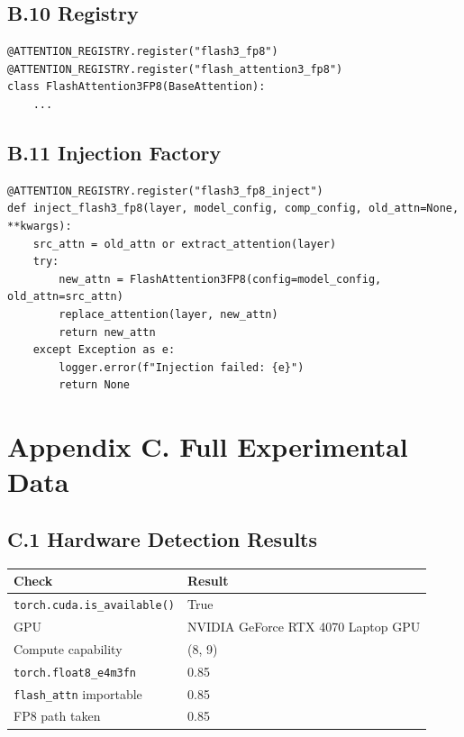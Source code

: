 \subsection{B.10 Registry}

\begin{lstlisting}
@ATTENTION_REGISTRY.register("flash3_fp8")
@ATTENTION_REGISTRY.register("flash_attention3_fp8")
class FlashAttention3FP8(BaseAttention):
    ...
\end{lstlisting}

\subsection{B.11 Injection Factory}

\begin{lstlisting}
@ATTENTION_REGISTRY.register("flash3_fp8_inject")
def inject_flash3_fp8(layer, model_config, comp_config, old_attn=None, **kwargs):
    src_attn = old_attn or extract_attention(layer)
    try:
        new_attn = FlashAttention3FP8(config=model_config, old_attn=src_attn)
        replace_attention(layer, new_attn)
        return new_attn
    except Exception as e:
        logger.error(f"Injection failed: {e}")
        return None
\end{lstlisting}




\section{Appendix C. Full Experimental Data}

\subsection{C.1 Hardware Detection Results}

\begin{table}[H]
\centering
\small
\begin{tabular}{ll}
\toprule
\textbf{Check} & \textbf{Result} \\
\midrule
\texttt{torch.cuda.is\_available()} & True \\
GPU & NVIDIA GeForce RTX 4070 Laptop GPU \\
Compute capability & (8, 9) \\
\texttt{torch.float8\_e4m3fn} & 0.85 \\
\texttt{flash\_attn} importable & 0.85 \\
FP8 path taken & 0.85 \\
\bottomrule
\end{tabular}
\end{table}

